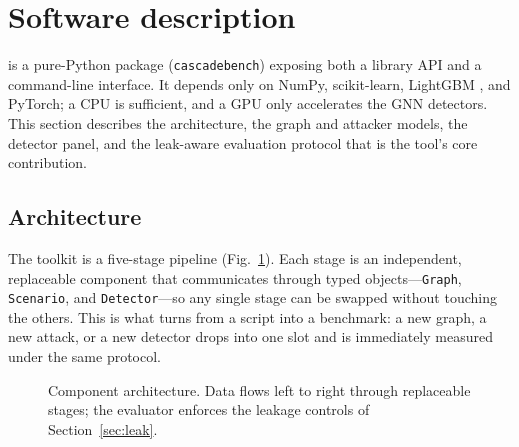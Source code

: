 \section{Software description}
\label{sec:method}

\tool is a pure-Python package (\texttt{cascadebench}) exposing both a library API and a
command-line interface. It depends only on NumPy, scikit-learn, LightGBM
\cite{ke2017lightgbm}, and PyTorch; a CPU is sufficient, and a GPU only accelerates the GNN
detectors. This section describes the architecture, the graph and attacker models, the
detector panel, and the leak-aware evaluation protocol that is the tool's core contribution.

\subsection{Architecture}
The toolkit is a five-stage pipeline (Fig.~\ref{fig:arch}). Each stage is an independent,
replaceable component that communicates through typed objects---\texttt{Graph},
\texttt{Scenario}, and \texttt{Detector}---so any single stage can be swapped without
touching the others. This is what turns \tool from a script into a benchmark: a new graph, a
new attack, or a new detector drops into one slot and is immediately measured under the same
protocol.

\begin{figure}[H]
\centering
{}
\caption{Component architecture. Data flows left to right through replaceable stages; the
evaluator enforces the leakage controls of Section~\ref{sec:leak}.}
\label{fig:arch}
\end{figure}

